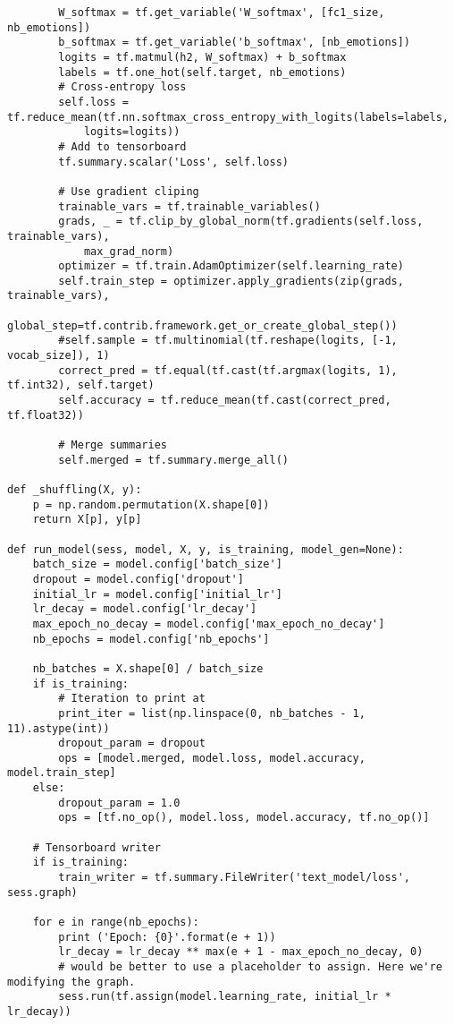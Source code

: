 \begin{lstlisting}
        W_softmax = tf.get_variable('W_softmax', [fc1_size, nb_emotions])
        b_softmax = tf.get_variable('b_softmax', [nb_emotions])
        logits = tf.matmul(h2, W_softmax) + b_softmax
        labels = tf.one_hot(self.target, nb_emotions)
        # Cross-entropy loss
        self.loss = tf.reduce_mean(tf.nn.softmax_cross_entropy_with_logits(labels=labels, 
            logits=logits))
        # Add to tensorboard
        tf.summary.scalar('Loss', self.loss)

        # Use gradient cliping
        trainable_vars = tf.trainable_variables()
        grads, _ = tf.clip_by_global_norm(tf.gradients(self.loss, trainable_vars), 
            max_grad_norm)
        optimizer = tf.train.AdamOptimizer(self.learning_rate)
        self.train_step = optimizer.apply_gradients(zip(grads, trainable_vars),
            global_step=tf.contrib.framework.get_or_create_global_step())
        #self.sample = tf.multinomial(tf.reshape(logits, [-1, vocab_size]), 1)
        correct_pred = tf.equal(tf.cast(tf.argmax(logits, 1), tf.int32), self.target)
        self.accuracy = tf.reduce_mean(tf.cast(correct_pred, tf.float32))

        # Merge summaries
        self.merged = tf.summary.merge_all()

def _shuffling(X, y):
    p = np.random.permutation(X.shape[0])
    return X[p], y[p]

def run_model(sess, model, X, y, is_training, model_gen=None):
    batch_size = model.config['batch_size']
    dropout = model.config['dropout']
    initial_lr = model.config['initial_lr']
    lr_decay = model.config['lr_decay']
    max_epoch_no_decay = model.config['max_epoch_no_decay']
    nb_epochs = model.config['nb_epochs']
    
    nb_batches = X.shape[0] / batch_size
    if is_training:
        # Iteration to print at
        print_iter = list(np.linspace(0, nb_batches - 1, 11).astype(int))
        dropout_param = dropout
        ops = [model.merged, model.loss, model.accuracy, model.train_step]
    else:
        dropout_param = 1.0
        ops = [tf.no_op(), model.loss, model.accuracy, tf.no_op()]

    # Tensorboard writer
    if is_training:
        train_writer = tf.summary.FileWriter('text_model/loss', sess.graph)

    for e in range(nb_epochs):
        print ('Epoch: {0}'.format(e + 1))
        lr_decay = lr_decay ** max(e + 1 - max_epoch_no_decay, 0)
        # would be better to use a placeholder to assign. Here we're modifying the graph.
        sess.run(tf.assign(model.learning_rate, initial_lr * lr_decay))


\end{lstlisting}
